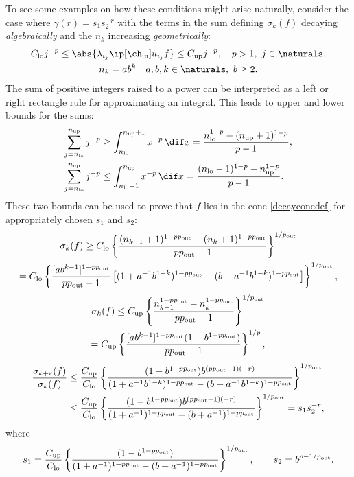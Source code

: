\documentclass[final]{elsarticle}
\newcommand{\chin}{\ch_{\text{\rm{in}}}}
\newcommand{\pout}{p_{\text{\rm{out}}}}
\theoremstyle{definition}
\theoremstyle{remark}
\DeclareMathOperator{\up}{up}
\DeclareMathOperator{\lo}{lo}
\begin{document}
To see some examples on how these conditions might arise naturally, consider the case where $\gamma(r)=s_1s_2^{-r}$ with the terms in the sum defining $\sigma_k(f)$ decaying \emph{algebraically} and the $n_k$ increasing \emph{geometrically}:
\begin{gather*}
C_{\lo} j^{-p} \le \abs{\lambda_{i_j} \ip[\chin]{u_{i_j}}{f}} \le C_{\up} j^{-p}, \quad  p>1, \ j \in \naturals, \\
n_k = a b^k  \quad a, b, k \in \naturals, \ b \ge 2.
\end{gather*}
The sum of positive integers raised to a power can be interpreted as a left or right rectangle rule for approximating an integral.  This leads to upper and lower bounds for the sums:
\begin{align*}
\sum_{j=n_{\lo}}^{n_{\up}} j^{-p}  & \ge \int_{n_{\lo}}^{n_{\up}+1} x^{-p}\, \dif x  = \frac{n_{\lo} ^{1-p} - (n_{\up}+1)^{1-p}}{p-1}, \\
\sum_{j=n_{\lo}}^{n_{\up}} j^{-p}  & \le \int_{n_{\lo}-1}^{n_{\up}} x^{-p}\, \dif x = \frac{(n_{\lo}-1) ^{1-p} - n_{\up}^{1-p}}{p-1}.
\end{align*}
These two bounds can be used to prove that $f$ lies in the cone \eqref{decayconedef} for appropriately chosen $s_1$ and $s_2$:
\begin{multline*}
\sigma_k(f) \ge C_{\lo} \left\{\frac{(n_{k-1}+1) ^{1-p\pout} - (n_{k}+1)^{1-p \pout}}{p \pout-1}\right\}^{1/\pout} \\
= C_{\lo} \left\{\frac{[ab^{k-1}]^{1-p \pout}}{p \pout-1} \left[(1+a^{-1}b^{1-k})^{1-p \pout} - (b+a^{-1}b^{1-k})^{1-p \pout}\right] \right\}^{1/\pout},
\end{multline*}
\begin{multline*}
\sigma_k(f) \le C_{\up}\left\{\frac{n_{k-1} ^{1-p \pout} - n_{k}^{1-p \pout}}{p \pout-1}\right\}^{1/\pout} \\
= C_{\up}\left\{\frac{[ab^{k-1}]^{1-p \pout} (1 - b^{1-p \pout})}{p \pout-1}\right\}^{1/p} ,
\end{multline*}
\begin{align*}
\frac{\sigma_{k+r}(f)}{\sigma_k(f)} &\le \frac{C_{\up}}  {C_{\lo}}
\left\{\frac{ (1 - b^{1-p \pout}) b^{(p \pout -1)(-r)} }  {(1+a^{-1}b^{1-k})^{1-p\pout} - (b+a^{-1}b^{1-k})^{1-p\pout}} \right\}^{1/\pout}\\
& \le \frac{C_{\up}}  {C_{\lo}}
\left\{\frac{(1 - b^{1-p\pout}) b^{(p \pout -1)(-r)} }  {(1+a^{-1})^{1-p\pout} - (b+a^{-1})^{1-p\pout}} \right\}^{1/\pout}   = s_1 s_2^{-r},
\end{align*}
where
\[
s_1 = \frac{ C_{\up}}  {C_{\lo}}\left\{\frac{(1 - b^{1-p\pout})}  {(1+a^{-1})^{1-p\pout} - (b+a^{-1})^{1-p\pout} } \right\}^{1/\pout}, \qquad s_2 = b^{p-1/\pout}.
\]
\end{document}
